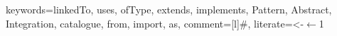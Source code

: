 
\usepackage{listings}

  {%
  keywords={linkedTo, uses, ofType, extends, implements,
    Pattern, Abstract, Integration, catalogue, from, import, as},
  comment=[l]\#,
  literate={<-}{{$\leftarrow$}}{1}
}
